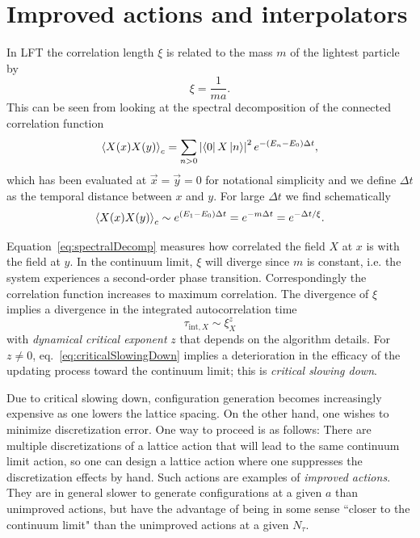 \section{Improved actions and interpolators}

In LFT the correlation length $\xi$ is related to the mass $m$ of the lightest 
particle by
\begin{equation}
  \xi=\frac{1}{ma}.
\end{equation}
This can be seen from looking at the spectral decomposition of the
connected correlation function
\begin{equation}\label{eq:spectralDecomp}
  \ev{X(x)X(y)}_c=\sum_{n> 0} 
                   \left|\bra{0}X\ket{n}\right|^2
                    e^{-(E_n-E_0)\Delta t},
\end{equation}
which has been evaluated at $\vec{x}=\vec{y}=0$ for notational simplicity and
we define $\Delta t$ as the temporal distance between $x$ and $y$.
For large $\Delta t$ we find schematically
\begin{equation}
  \ev{X(x)X(y)}_c\sim e^{(E_1-E_0)\Delta t} =e^{-m\Delta t}=e^{-\Delta t/\xi}.
\end{equation}

Equation~\eqref{eq:spectralDecomp} measures how correlated the field 
$X$ at $x$ is with the field at $y$. In the continuum limit, $\xi$ will 
diverge since $m$ is constant, i.e. the system experiences a second-order 
phase transition. Correspondingly the correlation function increases to
maximum correlation. The divergence of $\xi$ implies a divergence in the
integrated autocorrelation time
\begin{equation}\label{eq:criticalSlowingDown}
  \tau_{\text{int}, X} \sim \xi_X^z
\end{equation}
with {\it dynamical critical exponent} $z$ that depends on the algorithm 
details. For $z\neq 0$, eq.~\eqref{eq:criticalSlowingDown} implies a
deterioration in the efficacy of the updating process toward the
continuum limit; this is {\it critical slowing down}.

Due to critical slowing down, configuration generation becomes increasingly
expensive as one lowers the lattice spacing.
On the other hand, one wishes to minimize discretization error. One way to
proceed is as follows: There are multiple discretizations of a lattice action
that will lead to the same continuum limit action, so one can design a lattice
action where one suppresses the discretization effects by hand. Such actions
are examples of {\it improved actions}. They are in general slower to generate
configurations at a given $a$ than unimproved actions, but have the advantage
of being in some sense ``closer to the continuum limit" than the unimproved
actions at a given $N_\tau$.

